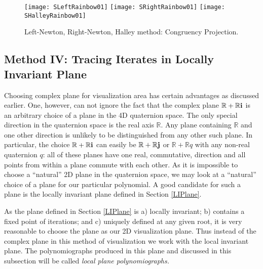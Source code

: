 \documentclass{article}
\theoremstyle{definition}
\def\br {{\mathbb R}} \def\bh {{\mathbb H}} \def\bc {{\mathbb C}} \def\al {\alpha}
\begin{document}
\begin{figure}
\begin{center}
\texttt{[image: SLeftRainbow01]}
\texttt{[image: SRightRainbow01]}
\texttt{[image: SHalleyRainbow01]}
\caption{Left-Newton, Right-Newton, Halley method: Congruency Projection.}
\label{leftComplexSpherical}
\end{center}
\end{figure}


\subsection{Method IV: Tracing  Iterates in  Locally Invariant Plane}

Choosing complex plane for visualization area has certain advantages as discussed earlier. One, however, can not ignore the fact that the complex plane $\br + \br {\bf i}$ is an arbitrary choice  of a plane in the 4D quaternion space. The only special direction in the quaternion space is the real axis $\br$. Any plane containing $\br$ and one other direction is unlikely to be distinguished from any other such plane. In particular, the choice $\br +\br {\bf i}$ can easily be $\br + \br {\bf j}$ or $\br + \br q$ with any non-real quaternion $q$: all of these planes have one real, commutative, direction and all points from within a plane commute with each other. As it is impossible to choose a ``natural'' 2D plane in the quaternion space, we may look at a ``natural'' choice of a plane for our particular polynomial. A good candidate for such a plane is the locally invariant plane defined in Section \ref{LIPlane}.

As the plane defined in Section \ref{LIPlane} is a) locally invariant; b) contains a fixed point of iterations; and c) uniquely defined at any given root, it is very reasonable to choose the plane as our 2D visualization plane. Thus instead of the complex plane in this method of visualization we work with the local invariant plane. The polynomiographs produced in this plane and discussed in this subsection will be called {\it local plane polynomiographs.}
\end{document}
